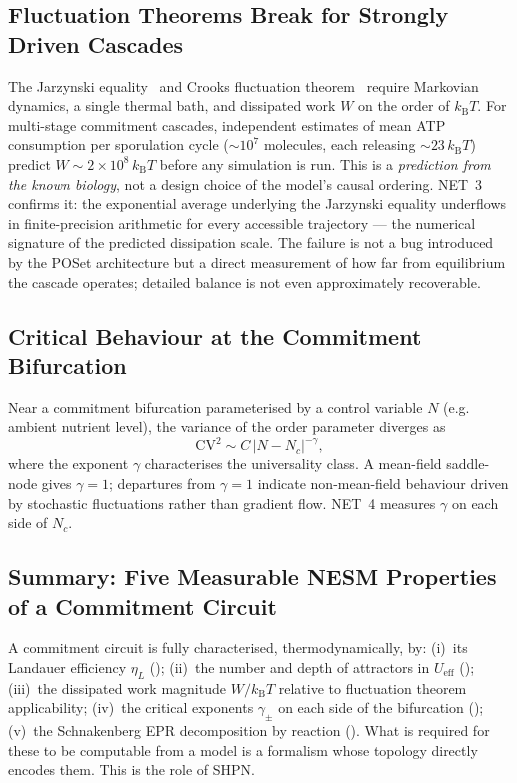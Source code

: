 \documentclass[11pt,a4paper]{article}
\newcommand{\kB}{k_{\mathrm{B}}}
\newcommand{\CV}{\mathrm{CV}}
\begin{document}
\subsection{Fluctuation Theorems Break for Strongly Driven Cascades}

The Jarzynski equality~\cite{Jarzynski1997} and Crooks fluctuation
theorem~\cite{Crooks1999} require Markovian dynamics, a single thermal
bath, and dissipated work \(W\) on the order of \(\kB T\).  For
multi-stage commitment cascades, independent estimates of mean ATP
consumption per sporulation cycle ($\sim 10^7$ molecules, each
releasing $\sim 23\,\kB T$) predict \(W \sim 2\times10^{8}\,\kB T\) before any
simulation is run.  This is a \emph{prediction from the known biology},
not a design choice of the model's causal ordering.  NET~3 confirms it:
the exponential average underlying the Jarzynski equality underflows in
finite-precision arithmetic for every accessible trajectory --- the
numerical signature of the predicted dissipation scale.  The failure is
not a bug introduced by the POSet architecture but a direct measurement
of how far from equilibrium the cascade operates; detailed balance is not
even approximately recoverable.

\subsection{Critical Behaviour at the Commitment Bifurcation}

Near a commitment bifurcation parameterised by a control variable
\(N\) (e.g. ambient nutrient level), the variance of the order parameter
diverges as
\begin{equation}
  \CV^2 \sim C\,|N - N_c|^{-\gamma},
  \label{eq:critical-scaling}
\end{equation}
where the exponent \(\gamma\) characterises the universality class.  A
mean-field saddle-node gives \(\gamma = 1\); departures from \(\gamma=1\)
indicate non-mean-field behaviour driven by stochastic fluctuations
rather than gradient flow.  NET~4 measures \(\gamma\) on each side of
\(N_c\).

\subsection{Summary: Five Measurable NESM Properties of a Commitment Circuit}

A commitment circuit is fully characterised, thermodynamically, by:
(i)~its Landauer efficiency \(\eta_L\) ();
(ii)~the number and depth of attractors in \(U_{\mathrm{eff}}\)
();
(iii)~the dissipated work magnitude \(W/\kB T\) relative to fluctuation
theorem applicability;
(iv)~the critical exponents \(\gamma_{\pm}\) on each side of the
bifurcation ();
(v)~the Schnakenberg EPR decomposition by reaction
().
What is required for these to be computable from a model is a formalism
whose topology directly encodes them.  This is the role of SHPN.
\end{document}
